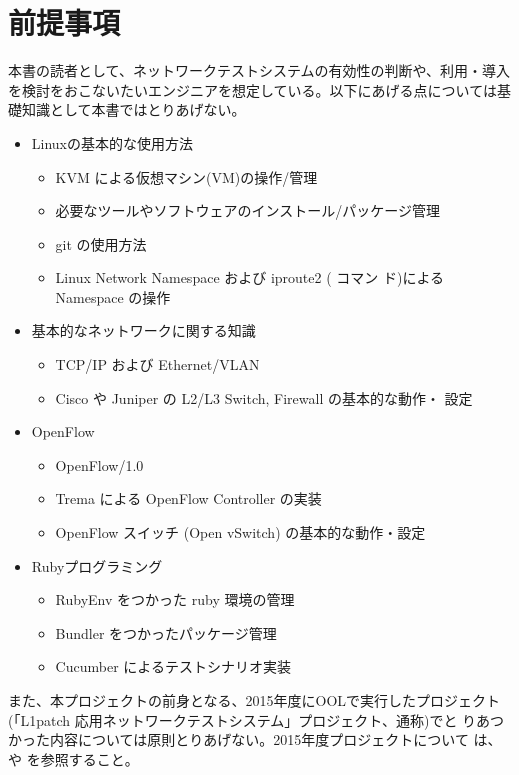  \section{前提事項}
 \label{sec:premise}

本書の読者として、ネットワークテストシステムの有効性の判断や、利用・導入
を検討をおこないたいエンジニアを想定している。以下にあげる点については基
礎知識として本書ではとりあげない。

\begin{itemize}
 \item Linuxの基本的な使用方法
       \begin{itemize}
        \item KVM による仮想マシン(VM)の操作/管理
        \item 必要なツールやソフトウェアのインストール/パッケージ管理
        \item git の使用方法
        \item Linux Network Namespace および iproute2 (  コマン
              ド)によるNamespace の操作
       \end{itemize}
 \item 基本的なネットワークに関する知識
       \begin{itemize}
        \item TCP/IP および Ethernet/VLAN
        \item Cisco や Juniper の L2/L3 Switch, Firewall の基本的な動作・
              設定
       \end{itemize}
 \item OpenFlow
       \begin{itemize}
        \item OpenFlow/1.0
        \item Trema による OpenFlow Controller の実装
        \item OpenFlow スイッチ (Open vSwitch) の基本的な動作・設定
       \end{itemize}
 \item Rubyプログラミング
       \begin{itemize}
        \item RubyEnv をつかった ruby 環境の管理
        \item Bundler をつかったパッケージ管理
        \item Cucumber によるテストシナリオ実装
       \end{itemize}
\end{itemize}

また、本プロジェクトの前身となる、2015年度にOOLで実行したプロジェクト
(「L1patch 応用ネットワークテストシステム」プロジェクト、通称\lopj)でと
りあつかった内容については原則とりあげない。2015年度プロジェクトについて
は、\lopjpoc や \lopjtech を参照すること。

